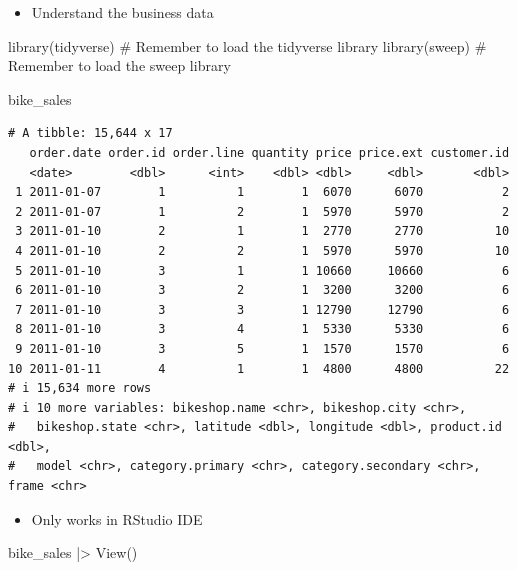 \documentclass[
  ignorenonframetext,
]{beamer}
\newenvironment{Shaded}{\begin{snugshade}}{\end{snugshade}}
\newcommand{\CommentTok}[1]{\textcolor[rgb]{0.37,0.37,0.37}{#1}}
\newcommand{\FunctionTok}[1]{\textcolor[rgb]{0.28,0.35,0.67}{#1}}
\newcommand{\NormalTok}[1]{\textcolor[rgb]{0.00,0.23,0.31}{#1}}
\newcommand{\SpecialCharTok}[1]{\textcolor[rgb]{0.37,0.37,0.37}{#1}}
\providecommand{\tightlist}{%
  \setlength{\itemsep}{0pt}\setlength{\parskip}{0pt}}\usepackage{longtable,booktabs,array}
\begin{document}
\begin{frame}[fragile]{}
\label{section-9}
\begin{itemize}
\tightlist
\item
  Understand the business data
\end{itemize}

\tiny

\begin{Shaded}
\begin{Highlighting}[]
\FunctionTok{library}\NormalTok{(tidyverse) }\CommentTok{\# Remember to load the tidyverse library}
\FunctionTok{library}\NormalTok{(sweep) }\CommentTok{\# Remember to load the sweep library}
\end{Highlighting}
\end{Shaded}

\begin{Shaded}
\begin{Highlighting}[]
\NormalTok{bike\_sales}
\end{Highlighting}
\end{Shaded}

\begin{verbatim}
# A tibble: 15,644 x 17
   order.date order.id order.line quantity price price.ext customer.id
   <date>        <dbl>      <int>    <dbl> <dbl>     <dbl>       <dbl>
 1 2011-01-07        1          1        1  6070      6070           2
 2 2011-01-07        1          2        1  5970      5970           2
 3 2011-01-10        2          1        1  2770      2770          10
 4 2011-01-10        2          2        1  5970      5970          10
 5 2011-01-10        3          1        1 10660     10660           6
 6 2011-01-10        3          2        1  3200      3200           6
 7 2011-01-10        3          3        1 12790     12790           6
 8 2011-01-10        3          4        1  5330      5330           6
 9 2011-01-10        3          5        1  1570      1570           6
10 2011-01-11        4          1        1  4800      4800          22
# i 15,634 more rows
# i 10 more variables: bikeshop.name <chr>, bikeshop.city <chr>,
#   bikeshop.state <chr>, latitude <dbl>, longitude <dbl>, product.id <dbl>,
#   model <chr>, category.primary <chr>, category.secondary <chr>, frame <chr>
\end{verbatim}

\normalsize

\begin{itemize}
\tightlist
\item
  Only works in RStudio IDE
\end{itemize}

\tiny

\begin{Shaded}
\begin{Highlighting}[]
\NormalTok{bike\_sales }\SpecialCharTok{|\textgreater{}} \FunctionTok{View}\NormalTok{()}
\end{Highlighting}
\end{Shaded}
\end{frame}
\end{document}
